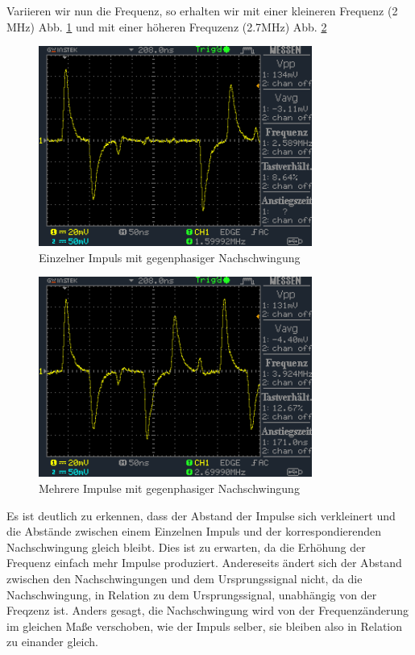\documentclass[a4paper,10pt]{article}
\numberwithin{equation}{section}
\begin{document}
Variieren wir nun die Frequenz, so erhalten wir mit einer kleineren Frequenz (2 MHz) Abb. \ref{fig:3.8} und mit einer höheren Frequzenz (2.7MHz) Abb. \ref{fig:3.9}
\begin{figure}[h]
        \centering
        \includegraphics[width=0.8\textwidth]{data/DS0024.BMP.png}
        \caption{Einzelner Impuls mit gegenphasiger Nachschwingung}
		\label{fig:3.8}
\end{figure}
\begin{figure}[h]
        \centering
        \includegraphics[width=0.8\textwidth]{data/DS0025.BMP.png}
        \caption{Mehrere Impulse mit gegenphasiger Nachschwingung}
		\label{fig:3.9}
\end{figure}

Es ist deutlich zu erkennen, dass der Abstand der Impulse sich verkleinert und die Abstände zwischen einem Einzelnen Impuls und der korrespondierenden Nachschwingung gleich bleibt. Dies ist zu erwarten, da die Erhöhung der Frequenz einfach mehr Impulse produziert. Andereseits ändert sich der Abstand zwischen den Nachschwingungen und dem Ursprungssignal nicht, da die Nachschwingung, in Relation zu dem Ursprungssignal, unabhängig von der Freqzenz ist. Anders gesagt, die Nachschwingung wird von der Frequenzänderung im gleichen Maße verschoben, wie der Impuls selber, sie bleiben also in Relation zu einander gleich.
\end{document}
